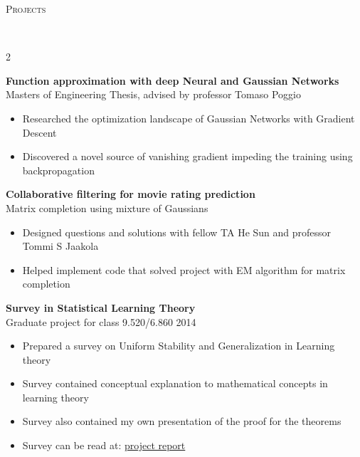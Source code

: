\documentclass{article}
\newenvironment{changemargin}[2]{%
  \begin{list}{}{%
    \setlength{\topsep}{0pt}%
    \setlength{\leftmargin}{#1}%
    \setlength{\rightmargin}{#2}%
    \setlength{\listparindent}{\parindent}%
    \setlength{\itemindent}{\parindent}%
    \setlength{\parsep}{\parskip}%
  }%
  \item[]}{\end{list}
}
\newcommand{\lineover}{
	\begin{changemargin}{-0.05in}{-0.05in}
		\vspace*{-8pt}
		\hrulefill \\
		\vspace*{-2pt}
	\end{changemargin}
}
\newcommand{\header}[1]{
	\begin{changemargin}{-0.5in}{-0.5in}
		\scshape{#1}\\
  	\lineover
	\end{changemargin}
}
\newenvironment{body} {
	\vspace*{-16pt}
	\begin{changemargin}{-0.25in}{-0.5in}
  }	
	{\end{changemargin}
}
\begin{document}
\header{Projects}
\begin{body}
	\vspace{6pt}
	\begin{multicols}{2}
    
    	\textbf {Function approximation with deep Neural and Gaussian Networks}\\
		Masters of Engineering Thesis, advised by professor Tomaso Poggio \\
		\vspace*{-3pt}
		\begin{itemize} \itemsep -2pt
			\item Researched the optimization landscape of Gaussian Networks with Gradient Descent
			\item Discovered a novel source of vanishing gradient impeding the training using backpropagation
		\end{itemize}
		\vspace{5pt}
        
        \textbf {Collaborative filtering for movie rating prediction}\\
		Matrix completion using mixture of Gaussians \\
		\vspace*{-3pt}
		\begin{itemize} \itemsep -2pt
			\item Designed questions and solutions with fellow TA He Sun and professor Tommi S Jaakola
            \item Helped implement code that solved project with EM algorithm for matrix completion
		\end{itemize}
		\vspace{5pt}
        
        \textbf {Survey in Statistical Learning Theory}\\
		Graduate project for class 9.520/6.860 2014\\
		\vspace*{-3pt}
		\begin{itemize} \itemsep -2pt
			\item Prepared a survey on Uniform Stability and Generalization in Learning theory
            \item Survey contained conceptual explanation to mathematical concepts in learning theory
            \item Survey also contained my own presentation of the proof for the theorems
			\item Survey can be read at: \href{https://www.quora.com/profile/Brando-Miranda/Posts/Uniform-Stability-and-Generalization-in-Learning-theory}{project report}
		\end{itemize}
		\vspace{5pt}
        

\end{multicols}
\end{body}
\end{document}
